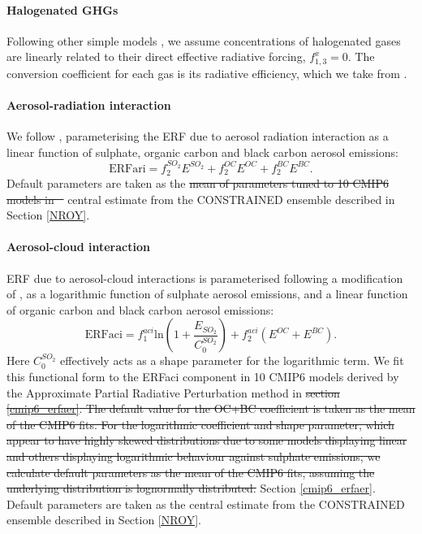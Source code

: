 \documentclass[gmd, manuscript]{copernicus}
\providecommand{\DIFadd}[1]{{\protect\color{blue}#1}} %
\providecommand{\DIFdel}[1]{{\protect\color{red}\sout{#1}}}                      %
\providecommand{\DIFaddbegin}{} %
\providecommand{\DIFaddend}{} %
\providecommand{\DIFdelbegin}{} %
\providecommand{\DIFdelend}{} %
\begin{document}
\paragraph*{Halogenated GHGs}
Following other simple models \citep{Smith2018,Meinshausen2011}, we assume concentrations of halogenated gases are linearly related to their direct effective radiative forcing, $f_{1,3}^x=0$. The conversion coefficient for each gas is its radiative efficiency, which we take from \cite{WMOAppA}.
\paragraph*{Aerosol-radiation interaction}
We follow \cite{Smith2020a}, parameterising the ERF due to aerosol radiation interaction as a linear function of sulphate, organic carbon and black carbon aerosol emissions: 
\begin{equation}
    \text{ERFari}= f_2^{SO_2} E^{SO_2} + f_2^{OC} E^{OC} + f_2^{BC} E^{BC}. \label{eq:ERFari}
\end{equation}
Default parameters are taken as the \DIFdelbegin \DIFdel{mean of parameters tuned to 10 CMIP6 models in \mbox{%
\cite[see section \ref{cmip6_erfaer}]{Smith2020a}}\hspace{0pt}%
}\DIFdelend \DIFaddbegin \DIFadd{central estimate from the CONSTRAINED ensemble described in Section \ref{NROY}}\DIFaddend .
\paragraph*{Aerosol-cloud interaction}
ERF due to aerosol-cloud interactions is parameterised following a modification of \cite{Smith2020a}, as a logarithmic function of sulphate aerosol emissions, and a linear function of organic carbon and black carbon aerosol emissions: 
\begin{equation}
    \text{ERFaci}= f_1^{aci}\text{ln}\left(1+\frac{E_{SO_2}}{C_0^{SO_2}}\right)+f_2^{aci}(E^{OC}+E^{BC}). \label{eq:ERFaci}
\end{equation}
Here $C_0^{SO_2}$ effectively acts as a shape parameter for the logarithmic term. We fit this functional form to the ERFaci component in 10 CMIP6 models derived by the Approximate Partial Radiative Perturbation method \citep{Zelinka2014} in \DIFdelbegin \DIFdel{section \ref{cmip6_erfaer}. The default value for the OC+BC coefficient is taken as the mean of the CMIP6 fits. For the logarithmic coefficient and shape parameter, which appear to have highly skewed distributions due to some models displaying linear and others displaying logarithmic behaviour against sulphate emissions, we calculate default parameters as the mean of the CMIP6 fits, assuming the underlying distribution is lognormally distributed.
}\DIFdelend \DIFaddbegin \DIFadd{Section \ref{cmip6_erfaer}. Default parameters are taken as the central estimate from the CONSTRAINED ensemble described in Section \ref{NROY}.
}
\end{document}
